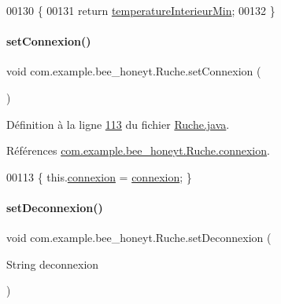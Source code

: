 \begin{DoxyCode}
00130     \{
00131         \textcolor{keywordflow}{return} \hyperlink{classcom_1_1example_1_1bee__honeyt_1_1_ruche_a143b0b293ab3aaa67a86550efeb56f07}{temperatureInterieurMin};
00132     \}
\end{DoxyCode}
\mbox{\label{classcom_1_1example_1_1bee__honeyt_1_1_ruche_a6e1d75a4baf0c9255961bc64f7deca36}} 
\paragraph{\texorpdfstring{set\+Connexion()}{setConnexion()}}
{\footnotesize\ttfamily void com.\+example.\+bee\+\_\+honeyt.\+Ruche.\+set\+Connexion (\begin{DoxyParamCaption}{ }\end{DoxyParamCaption})}



Définition à la ligne \hyperlink{_ruche_8java_source_l00113}{113} du fichier \hyperlink{_ruche_8java_source}{Ruche.\+java}.



Références \hyperlink{_ruche_8java_source_l00021}{com.\+example.\+bee\+\_\+honeyt.\+Ruche.\+connexion}.


\begin{DoxyCode}
00113 \{ this.\hyperlink{classcom_1_1example_1_1bee__honeyt_1_1_ruche_a8b1b18ca9364533f66214ed9daea875e}{connexion} = \hyperlink{classcom_1_1example_1_1bee__honeyt_1_1_ruche_a8b1b18ca9364533f66214ed9daea875e}{connexion}; \}
\end{DoxyCode}
\mbox{\label{classcom_1_1example_1_1bee__honeyt_1_1_ruche_ae247736718ddb17f37e76e0615906091}} 
\paragraph{\texorpdfstring{set\+Deconnexion()}{setDeconnexion()}}
{\footnotesize\ttfamily void com.\+example.\+bee\+\_\+honeyt.\+Ruche.\+set\+Deconnexion (\begin{DoxyParamCaption}\item[{String}]{deconnexion }\end{DoxyParamCaption})}



